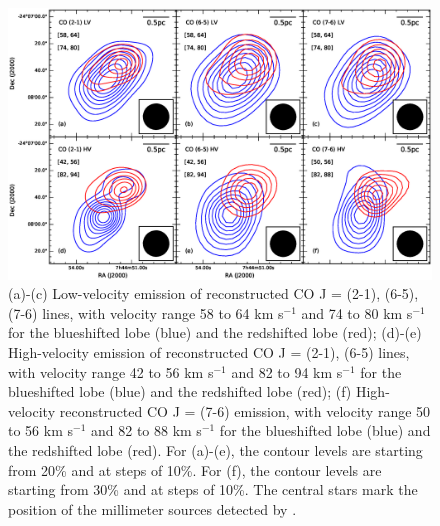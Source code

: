 
\begin{figure}
\includegraphics[scale=.6]{./fig/cvl_contour.eps}
\caption{(a)-(c) Low-velocity emission of reconstructed CO J = (2-1), (6-5), (7-6) lines, with velocity range 58 to 64 km s$^{-1} $ and 74 to 80 km s$^{-1}$ for the blueshifted lobe (blue) and the redshifted lobe (red); (d)-(e) High-velocity emission of reconstructed CO J = (2-1), (6-5) lines, with velocity range 42 to 56 km s$^{-1} $ and 82 to 94 km s$^{-1}$ for the blueshifted lobe (blue) and  the redshifted lobe (red); (f) High-velocity reconstructed CO J = (7-6) emission, with velocity range 50 to 56 km s$^{-1} $ and 82 to 88 km s$^{-1}$ for the blueshifted lobe (blue) and  the redshifted lobe (red). For (a)-(e), the contour levels are starting from 20\% and at steps of 10\%. For (f), the contour levels are starting from 30\% and at steps of 10\%. The central stars mark the position of the millimeter sources detected by \citet{2009ApJ...696...66Q}.  \label{fig2}}
\end{figure}


